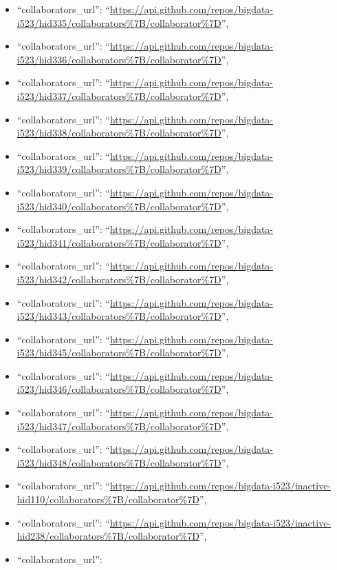 \begin{itemize}
\item
  ``collaborators\_url'':
  ``\url{https://api.github.com/repos/bigdata-i523/hid335/collaborators\%7B/collaborator\%7D}'',
\item
  ``collaborators\_url'':
  ``\url{https://api.github.com/repos/bigdata-i523/hid336/collaborators\%7B/collaborator\%7D}'',
\item
  ``collaborators\_url'':
  ``\url{https://api.github.com/repos/bigdata-i523/hid337/collaborators\%7B/collaborator\%7D}'',
\item
  ``collaborators\_url'':
  ``\url{https://api.github.com/repos/bigdata-i523/hid338/collaborators\%7B/collaborator\%7D}'',
\item
  ``collaborators\_url'':
  ``\url{https://api.github.com/repos/bigdata-i523/hid339/collaborators\%7B/collaborator\%7D}'',
\item
  ``collaborators\_url'':
  ``\url{https://api.github.com/repos/bigdata-i523/hid340/collaborators\%7B/collaborator\%7D}'',
\item
  ``collaborators\_url'':
  ``\url{https://api.github.com/repos/bigdata-i523/hid341/collaborators\%7B/collaborator\%7D}'',
\item
  ``collaborators\_url'':
  ``\url{https://api.github.com/repos/bigdata-i523/hid342/collaborators\%7B/collaborator\%7D}'',
\item
  ``collaborators\_url'':
  ``\url{https://api.github.com/repos/bigdata-i523/hid343/collaborators\%7B/collaborator\%7D}'',
\item
  ``collaborators\_url'':
  ``\url{https://api.github.com/repos/bigdata-i523/hid345/collaborators\%7B/collaborator\%7D}'',
\item
  ``collaborators\_url'':
  ``\url{https://api.github.com/repos/bigdata-i523/hid346/collaborators\%7B/collaborator\%7D}'',
\item
  ``collaborators\_url'':
  ``\url{https://api.github.com/repos/bigdata-i523/hid347/collaborators\%7B/collaborator\%7D}'',
\item
  ``collaborators\_url'':
  ``\url{https://api.github.com/repos/bigdata-i523/hid348/collaborators\%7B/collaborator\%7D}'',
\item
  ``collaborators\_url'':
  ``\url{https://api.github.com/repos/bigdata-i523/inactive-hid110/collaborators\%7B/collaborator\%7D}'',
\item
  ``collaborators\_url'':
  ``\url{https://api.github.com/repos/bigdata-i523/inactive-hid238/collaborators\%7B/collaborator\%7D}'',
\item
  ``collaborators\_url'':

\end{itemize}
